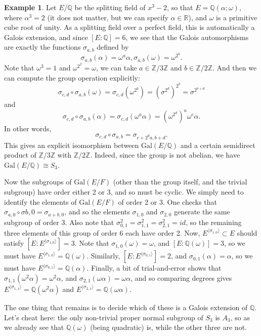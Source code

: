 \documentclass[12pt]{report}
\theoremstyle{definition}
\newtheorem{example}[thm]{Example}
\def\ZZ{\mathbb{Z}}
\def\QQ{\mathbb{Q}}
\def\RR{\mathbb{R}}
\def\aa{\alpha}
\def\Gal{\text{Gal}}
\begin{document}
\begin{example}
    Let $E/\QQ$ be the splitting field of $x^3 - 2$, so that $E = \QQ(\aa; \omega)$, where $\aa^3 = 2$ (it does not matter, but we can specify $\aa\in \RR$), and $\omega$ is a primitive cube root of unity. As a splitting field over a perfect field, this is automatically a Galois extension, and since $[E :\QQ] = 6$, we see that the Galois automorphisms are exactly the functions $\sigma_{a,b}$ defined by $$\sigma_{a,b}(\aa)=\omega^a \aa, \sigma_{a,b}(\omega)=\omega^{2^b}.$$
    Note that $\omega^3=1$ and $\omega^{2^2}=\omega$, we can take $a\in\ZZ/3\ZZ$ and $b\in\ZZ/2\ZZ$. And then we can compute the group operation explicitly: $$\sigma_{c,d}\circ\sigma_{a,b}(\omega)=\sigma_{c,d}(\omega^{2^b}) = (\sigma^{2^d})^{2^b} = \sigma^{2^{b+d}}$$
    and $$\sigma_{c,d}\circ\sigma_{a,b}(\aa)= \sigma_{c,d}(\omega^a \aa) = (\omega^{2^d})^a \omega^c\aa.$$
    In other words, $$\sigma_{c,d}\circ\sigma_{a,b}=\sigma_{c+2^da,b+d}.$$
    This gives an explicit isomorphism between $\Gal(E/\QQ)$ and a certain semidirect product of $\ZZ/3\ZZ$ with $\ZZ/2\ZZ$. Indeed, since the group is not abelian, we have $\Gal(E/\QQ)\cong S_3$.
    
    Now the subgroups of $\Gal(E/F)$ (other than the group itself, and the trivial subgroup) have order either 2 or 3, and so must be cyclic. We simply need to identify the elements of $\Gal(E/F)$ of order 2 or 3. One checks that $\sigma_{a,0}\circ\sigma{b,0} = \sigma_{a+b,0}$, and so the elements $\sigma_{1,0}$ and $\sigma_{2,0}$ generate the same subgroup of order 3. Also note that $\sigma_{0,1}^2 = \sigma_{1,1}^2 = \sigma_{2,1}^2 = id$, so the remaining three elements of this group of order 6 each have order 2. Now, $E^{\langle \sigma_{1,0}\rangle} \subset E$ should satisfy $[E : E^{\langle \sigma_{1,0}\rangle}] = 3$. Note that $\sigma_{1,0}(\omega) = \omega$, and $[E : \QQ(\omega)] = 3$, so we must have $E^{\langle \sigma_{1,0}\rangle} = \QQ(\omega)$. Similarly, $[E : E^{\langle \sigma_{0,1}\rangle}] = 2$, and $\sigma_{0,1}(\aa) = \aa$, so we must have $E^{\langle \sigma_{0,1}\rangle} = \QQ(\aa)$. Finally, a bit of trial-and-error shows that $\sigma_{1,1}(\omega^2\aa) = \omega^2\aa$, and $\sigma_{2,1}(\omega\aa) = \omega\aa$, and so comparing degrees gives $E^{\langle \sigma_{1,1}\rangle} = \QQ(\omega^2\aa)$ and $E^{\langle \sigma_{2,1}\rangle} = \QQ(\omega\aa)$.

    The one thing that remains is to decide which of these is a Galois extension of $\QQ$. Let's cheat here: the only non-trivial proper normal subgroup of $S_3$ is $A_3$, so as we already see that $\QQ(\omega)$ (being quadratic) is, while the other three are not.
\end{example}
\end{document}
